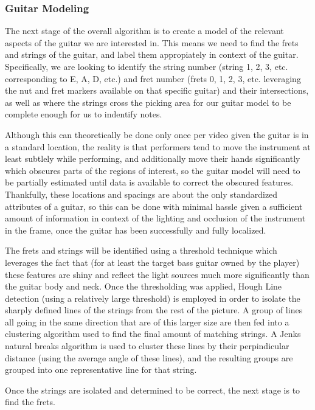 \subsubsection{Guitar Modeling}
The next stage of the overall algorithm is to create a model of the relevant aspects of the guitar we are interested in.
This means we need to find the frets and strings of the guitar, and label them appropiately in context of the guitar.
Specifically, we are looking to identify the string number (string 1, 2, 3, etc. corresponding to E, A, D, etc.)
and fret number (frets 0, 1, 2, 3, etc. leveraging the nut and fret markers available on that specific guitar) and
their intersections, as well as where the strings cross the picking area for our guitar model to be complete enough
for us to indentify notes.
\par
Although this can theoretically be done only once per video given the guitar is in a standard location, 
the reality is that performers tend to move the instrument at least subtlely while performing,
and additionally move their hands significantly which obscures parts of the regions of interest,
so the guitar model will need to be partially estimated until data is available to correct the obscured features.
Thankfully, these locations and spacings are about the only standardized attributes of a guitar,
so this can be done with minimal hassle given a sufficient amount of information in context of the lighting
and occlusion of the instrument in the frame, once the guitar has been successfully and fully localized.
\par
The frets and strings will be identified using a threshold technique which leverages the fact that
(for at least the target bass guitar owned by the player) these features are shiny and reflect
the light sources much more significantly than the guitar body and neck.
Once the thresholding was applied, Hough Line detection (using a relatively large threshold)
is employed in order to isolate the sharply defined lines of the strings from the rest of the picture.
A group of lines all going in the same direction that are of this larger size are then fed into a clustering algorithm
used to find the final amount of matching strings. A Jenks natural breaks algorithm is used to cluster these
lines by their perpindicular distance (using the average angle of these lines), and the resulting groups
are grouped into one representative line for that string.
\par
Once the strings are isolated and determined to be correct, the next stage is to find the frets.
